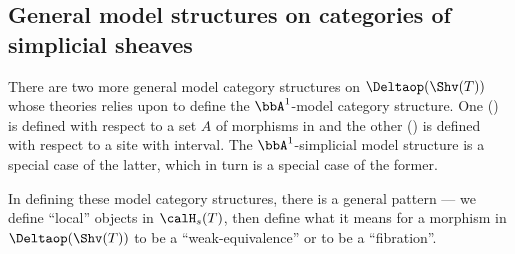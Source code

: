 






\subsection{General model structures on categories of simplicial sheaves}

There are two more general model category structures on $\Deltaop(\Shv(T))$ whose theories \cite{morel_voevodsky_1999} relies upon to define the $\bbA^1$-model category structure. One () is defined with respect to a set $A$ of morphisms in  and the other () is defined with respect to a site with interval. The $\bbA^1$-simplicial model structure is a special case of the latter, which in turn is a special case of the former. 

In defining these model category structures, there is a general pattern --- we define ``local'' objects in $\calH_s(T)$, then define what it means for a morphism in $\Deltaop(\Shv(T))$ to be a ``weak-equivalence'' or to be a ``fibration''.










